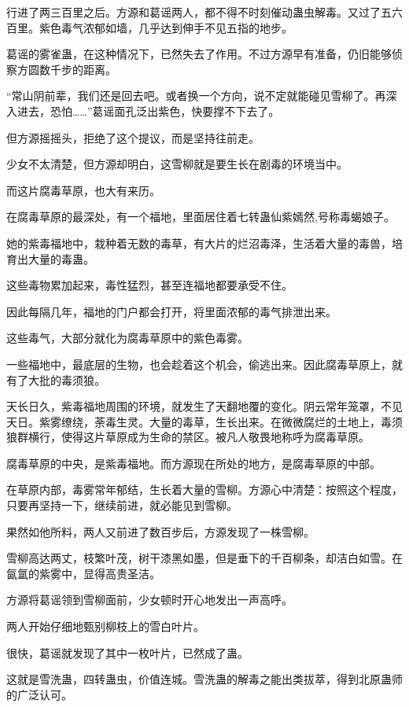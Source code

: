 \begin{this_body}
行进了两三百里之后。方源和葛谣两人，都不得不时刻催动蛊虫解毒。又过了五六百里。紫色毒气浓郁如墙，几乎达到伸手不见五指的地步。

葛谣的雾雀蛊，在这种情况下，已然失去了作用。不过方源早有准备，仍旧能够侦察方圆数千步的距离。

“常山阴前辈，我们还是回去吧。或者换一个方向，说不定就能碰见雪柳了。再深入进去，恐怕……”葛谣面孔泛出紫色，快要撑不下去了。

但方源摇摇头，拒绝了这个提议，而是坚持往前走。

少女不太清楚，但方源却明白，这雪柳就是要生长在剧毒的环境当中。

而这片腐毒草原，也大有来历。

在腐毒草原的最深处，有一个福地，里面居住着七转蛊仙紫嫣然,号称毒蝎娘子。

她的紫毒福地中，栽种着无数的毒草，有大片的烂沼毒泽，生活着大量的毒兽，培育出大量的毒蛊。

这些毒物累加起来，毒性猛烈，甚至连福地都要承受不住。

因此每隔几年，福地的门户都会打开，将里面浓郁的毒气排泄出来。

这些毒气，大部分就化为腐毒草原中的紫色毒雾。

一些福地中，最底层的生物，也会趁着这个机会，偷逃出来。因此腐毒草原上，就有了大批的毒须狼。

天长日久，紫毒福地周围的环境，就发生了天翻地覆的变化。阴云常年笼罩，不见天日。紫雾缭绕，荼毒生灵。大量的毒草，生长出来。在微微腐烂的土地上，毒须狼群横行，使得这片草原成为生命的禁区。被凡人敬畏地称呼为腐毒草原。

腐毒草原的中央，是紫毒福地。而方源现在所处的地方，是腐毒草原的中部。

在草原内部，毒雾常年郁结，生长着大量的雪柳。方源心中清楚：按照这个程度，只要再坚持一下，继续前进，就必能见到雪柳。

果然如他所料，两人又前进了数百步后，方源发现了一株雪柳。

雪柳高达两丈，枝繁叶茂，树干漆黑如墨，但是垂下的千百柳条，却洁白如雪。在氤氲的紫雾中，显得高贵圣洁。

方源将葛谣领到雪柳面前，少女顿时开心地发出一声高呼。

两人开始仔细地甄别柳枝上的雪白叶片。

很快，葛谣就发现了其中一枚叶片，已然成了蛊。

这就是雪洗蛊，四转蛊虫，价值连城。雪洗蛊的解毒之能出类拔萃，得到北原蛊师的广泛认可。


\end{this_body}

